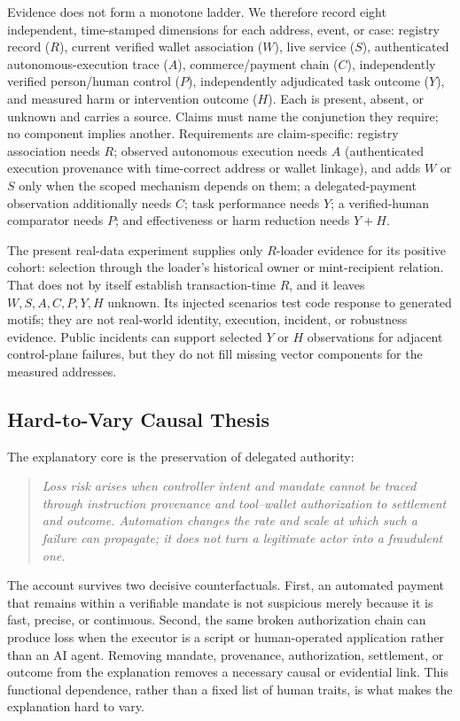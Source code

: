 Evidence does not form a monotone ladder.  We therefore record eight
independent, time-stamped dimensions for each address, event, or case:
registry record ($R$), current verified wallet association ($W$), live service
($S$), authenticated autonomous-execution trace ($A$), commerce/payment chain
($C$), independently verified person/human control ($P$), independently
adjudicated task outcome ($Y$), and measured harm or intervention outcome
($H$). Each is present, absent, or unknown and carries a
source.  Claims must name the conjunction they require; no component implies
another.  Requirements are claim-specific: registry association needs $R$;
observed autonomous execution needs $A$ (authenticated execution provenance
with time-correct address or wallet linkage), and adds $W$ or $S$ only when the
scoped mechanism depends on them; a delegated-payment observation additionally
needs $C$; task performance needs $Y$; a verified-human comparator needs $P$;
and effectiveness or harm reduction needs $Y+H$.

The present real-data experiment supplies only $R$-loader evidence for its
positive cohort: selection through the loader's historical owner or
mint-recipient relation.  That does not by itself establish transaction-time
$R$, and it leaves $W,S,A,C,P,Y,H$ unknown. Its injected
scenarios test code response to generated motifs; they are not real-world
identity, execution, incident, or robustness evidence.  Public incidents can
support selected $Y$ or $H$ observations for adjacent control-plane failures,
but they do not fill missing vector components for the measured addresses.

\subsection{Hard-to-Vary Causal Thesis}\label{subsec:hardtovary}

The explanatory core is the preservation of delegated authority:
\begin{quote}
\itshape
Loss risk arises when controller intent and mandate cannot be traced through
instruction provenance and tool--wallet authorization to settlement and
outcome.  Automation changes the rate and scale at which such a failure can
propagate; it does not turn a legitimate actor into a fraudulent one.
\end{quote}

The account survives two decisive counterfactuals.  First, an automated payment
that remains within a verifiable mandate is not suspicious merely because it is
fast, precise, or continuous.  Second, the same broken authorization chain can
produce loss when the executor is a script or human-operated application rather
than an AI agent.  Removing mandate, provenance, authorization, settlement, or
outcome from the explanation removes a necessary causal or evidential link.
This functional dependence, rather than a fixed list of human traits, is what
makes the explanation hard to vary\cite{deutsch2011}.
